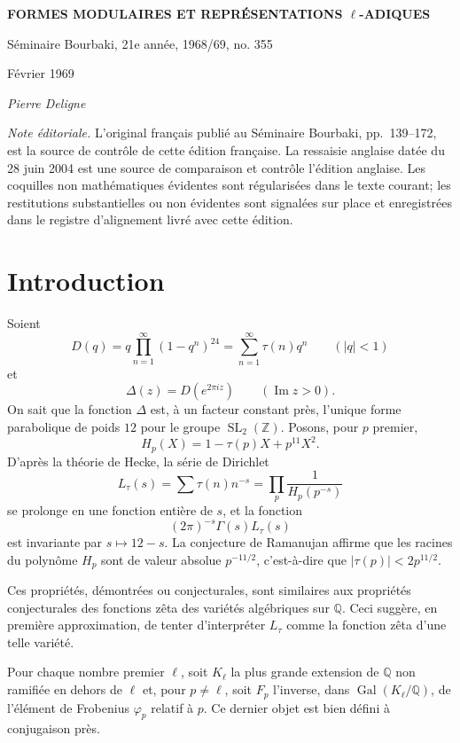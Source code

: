 \documentclass[10pt]{article}
\newcommand{\Q}{\mathbb Q}
\newcommand{\Z}{\mathbb Z}
\newcommand{\SL}{\operatorname{SL}}
\newcommand{\Gal}{\operatorname{Gal}}
\begin{document}
\begin{center}
{\Large\bfseries FORMES MODULAIRES ET REPRÉSENTATIONS $\ell$-ADIQUES}\par
\vspace{0.35em}
{\large Séminaire Bourbaki, 21e année, 1968/69, no. 355}\par
{\small Février 1969}\par
\vspace{0.7em}
{\itshape Pierre Deligne}
\end{center}

\noindent\emph{Note éditoriale.} L'original français publié au Séminaire Bourbaki,
pp.~139--172, est la source de contrôle de cette édition française. La ressaisie anglaise
datée du 28 juin 2004 est une source de comparaison et contrôle l'édition anglaise.
Les coquilles non mathématiques évidentes sont régularisées dans le texte courant;
les restitutions substantielles ou non évidentes sont signalées sur place et enregistrées
dans le registre d'alignement livré avec cette édition.

\section{Introduction}

Soient
\[
D(q)=q\prod_{n=1}^{\infty}(1-q^n)^{24}
     =\sum_{n=1}^{\infty}\tau(n)q^n
\qquad (|q|<1)
\]
et
\[
\Delta(z)=D(e^{2\pi iz})\qquad (\operatorname{Im} z>0).
\]
On sait que la fonction $\Delta$ est, à un facteur constant près, l'unique forme parabolique
de poids $12$ pour le groupe $\SL_2(\Z)$. Posons, pour $p$ premier,
\[
H_p(X)=1-\tau(p)X+p^{11}X^2 .
\]
D'après la théorie de Hecke, la série de Dirichlet
\[
L_\tau(s)=\sum \tau(n)n^{-s}=\prod_p\frac{1}{H_p(p^{-s})}
\]
se prolonge en une fonction entière de $s$, et la fonction
\[
(2\pi)^{-s}\Gamma(s)L_\tau(s)
\]
est invariante par $s\mapsto 12-s$. La conjecture de Ramanujan affirme que les racines
du polynôme $H_p$ sont de valeur absolue $p^{-11/2}$, c'est-à-dire que
$|\tau(p)|<2p^{11/2}$.

Ces propriétés, démontrées ou conjecturales, sont similaires aux propriétés conjecturales
des fonctions zêta des variétés algébriques sur $\Q$. Ceci suggère, en première
approximation, de tenter d'interpréter $L_\tau$ comme la fonction zêta d'une telle variété.

Pour chaque nombre premier $\ell$, soit $K_\ell$ la plus grande extension de $\Q$ non
ramifiée en dehors de $\ell$ et, pour $p\ne\ell$, soit $F_p$ l'inverse, dans $\Gal(K_\ell/\Q)$,
de l'élément de Frobenius $\varphi_p$ relatif à $p$. Ce dernier objet est bien défini à
conjugaison près.
\end{document}
